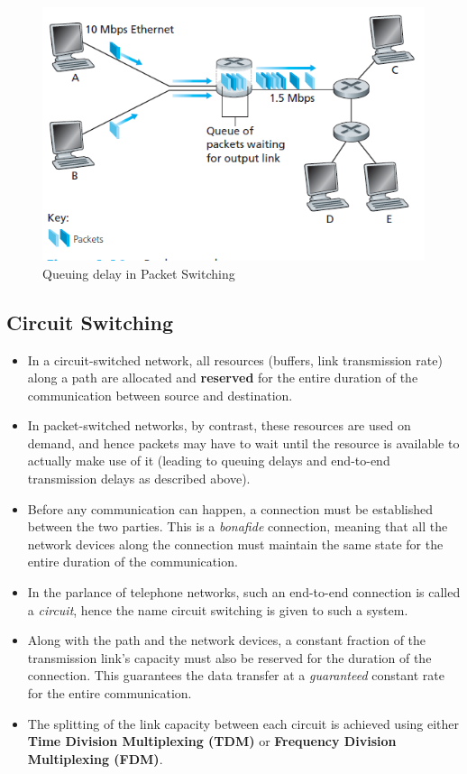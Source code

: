 \documentclass{article}
\theoremstyle{plain}
\theoremstyle{definition}
\begin{document}
    \begin{figure}[ht]
        \centering
        \includegraphics{cn7.png}
        \caption{Queuing delay in Packet Switching}
        \label{fig:my_label_7}
    \end{figure}
    
\subsection{Circuit Switching}
\begin{itemize}
    \item In a circuit-switched network, all resources (buffers, link transmission rate) along a path are allocated and \textbf{reserved} for the entire duration of the communication between source and destination. 
    
    \item In packet-switched networks, by contrast, these resources are used on demand, and hence packets may have to wait until the resource is available to actually make use of it (leading to queuing delays and end-to-end transmission delays as described above). 
    
    \item Before any communication can happen, a connection must be established between the two parties. This is a \textit{bonafide} connection, meaning that all the network devices along the connection must maintain the same state for the entire duration of the communication. 
    
    \item In the parlance of telephone networks, such an end-to-end connection is called a \textit{circuit}, hence the name circuit switching is given to such a system. 
    
    \item Along with the path and the network devices, a constant fraction of the transmission link's capacity must also be reserved for the duration of the connection. This guarantees the data transfer at a  \textit{guaranteed} constant rate for the entire communication. 
    
    \item The splitting of the link capacity between each circuit is achieved using either\textbf{ Time Division Multiplexing (TDM)} or \textbf{Frequency Division Multiplexing (FDM)}.
\end{itemize}
\end{document}
